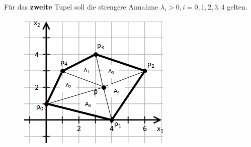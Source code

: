 \documentclass[a4paper,10pt,DIV=14]{article}
\begin{document}
Für das \textbf{zweite} Tupel soll die strengere Annahme $\lambda_i > 0, i = 0,1,2,3,4$ gelten.

\begin{figure}[!htbp]
	\centering
	\includegraphics[]{simplex}
\end{figure}
\end{document}

